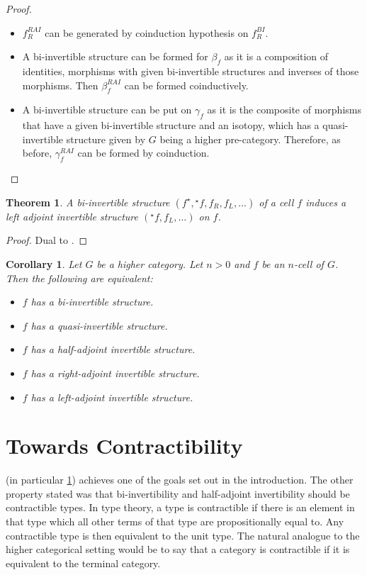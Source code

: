 \documentclass[draft]{article}
\renewcommand{\comment}[1]{\todo[color=green!40]{#1}}
\newtheorem{theorem}{Theorem} \newtheorem{prop}{Proposition}
\newtheorem{cor}{Corollary} \newtheorem{lemma}{Lemma}
\theoremstyle{definition} \newtheorem{definition}{Definition}
\theoremstyle{remark} \newtheorem{remark}{Remark}
\newcommand{\linv}[1]{{}^\star\!#1} \newcommand{\rinv}[1]{#1^\star}
\begin{document}
\begin{proof}
\begin{itemize}
\begin{center}
    \end{center}
  \item \(f_R^{RAI}\) can be generated by coinduction hypothesis on
    \(f_R^{BI}\).
  \item A bi-invertible structure can be formed for \(\beta_f\) as it
    is a composition of identities, morphisms with given bi-invertible
    structures and inverses of those morphisms. Then \(\beta_f^{RAI}\)
    can be formed coinductively.
  \item A bi-invertible structure can be put on \(\gamma_f\) as it is
    the composite of morphisms that have a given bi-invertible
    structure and an isotopy, which has a quasi-invertible structure
    given by \(G\) being a higher pre-category. Therefore, as before,
    \(\gamma_f^{RAI}\) can be formed by coinduction. \end{itemize}
\end{proof}

\begin{theorem}
  A bi-invertible structure \((\rinv f, \linv f, f_R, f_L, \dots)\) of
  a cell \(f\) induces a left adjoint invertible structure \((\linv f,
  f_L, \dots)\) on \(f\).
\end{theorem}
\begin{proof}
  Dual to .
\end{proof}

\begin{cor}\label{cor:equiv}
  Let \(G\) be a higher category. Let \(n > 0\) and \(f\) be an
  \(n\)-cell of \(G\). Then the following are equivalent:
  \begin{itemize}
  \item \(f\) has a bi-invertible structure.
  \item \(f\) has a quasi-invertible structure.
  \item \(f\) has a half-adjoint invertible structure.
  \item \(f\) has a right-adjoint invertible structure.
  \item \(f\) has a left-adjoint invertible structure.
  \end{itemize}\comment{Is this also bad?}
\end{cor}

\section{Towards Contractibility}\label{sec:contractibility}

 (in particular \cref{cor:equiv}) achieves one of the
goals set out in the introduction. The other property stated was that
bi-invertibility and half-adjoint invertibility should be contractible
types. In type theory, a type is contractible if there is an element
in that type which all other terms of that type are propositionally
equal to. Any contractible type is then equivalent to the unit type.
The natural analogue to the higher categorical setting would be to say
that a category is contractible if it is equivalent to the terminal
category.
\end{document}
